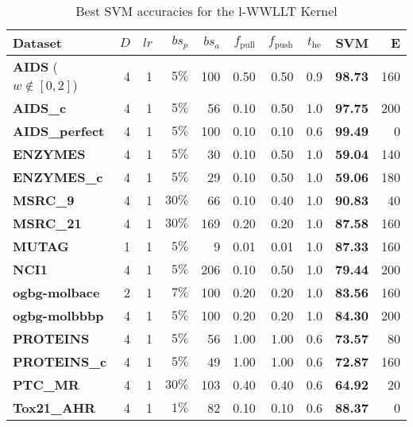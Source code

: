     	\begin{table}[h]
    		\centering
    		\begin{tabular}{|l||r|r|r|r|r|r|c||rr|}
    			\hline
    			\textbf{Dataset} & $D$ & $lr$ & $bs_p$ & $bs_a$ & $f_{\text{pull}}$ & $f_{\text{push}}$ & $t_{\text{he}}$ & \textbf{SVM} & E \\ \hline\hline
    			\textbf{AIDS} ($w\notin [0,2]$) & 4 & 1 & $5\%$ & 100 & 0.50 & 0.50 & 0.9 & \textbf{98.73} & 160 \\ \hline %
    			\textbf{AIDS\_c} 				& 4 & 1 & $5\%$ &  56 & 0.10 & 0.50 & 1.0 & \textbf{97.75} & 200 \\ \hline %
    			\textbf{AIDS\_perfect} 			& 4 & 1 & $5\%$ & 100 & 0.10 & 0.10 & 0.6 & \textbf{99.49} & 0	\\ \hline %
    			\textbf{ENZYMES} 				& 4 & 1 & $5\%$ &  30 & 0.10 & 0.50 & 1.0 & \textbf{59.04} & 140 \\ \hline %
    			\textbf{ENZYMES\_c} 			& 4 & 1 & $5\%$ &  29 & 0.10 & 0.50 & 1.0 & \textbf{59.06} & 180 \\ \hline %
    			\textbf{MSRC\_9} 				& 4 & 1 & $30\%$ &  66 & 0.10 & 0.40 & 1.0 & \textbf{90.83} & 40 	\\ \hline %
    			\textbf{MSRC\_21} 				& 4 & 1 & $30\%$ & 169 & 0.20 & 0.20 & 1.0 & \textbf{87.58} & 160 \\ \hline %
    			\textbf{MUTAG} 					& 1 & 1 & $5\%$ &   9 & 0.01 & 0.01 & 1.0 & \textbf{87.33} & 160 \\ \hline %
    			\textbf{NCI1} 					& 4 & 1 & $5\%$ & 206 & 0.10 & 0.50 & 1.0 & \textbf{79.44} & 200 \\ \hline %
    			\textbf{ogbg-molbace} 			& 2 & 1 & $7\%$ & 100 & 0.20 & 0.20 & 1.0 & \textbf{83.56} & 160	\\ \hline %
    			\textbf{ogbg-molbbbp} 			& 4 & 1 & $5\%$ & 100 & 0.20 & 0.20 & 1.0 & \textbf{84.30} & 200 \\ \hline %
    			\textbf{PROTEINS} 				& 4 & 1 & $5\%$ &  56 & 1.00 & 1.00 & 0.6 & \textbf{73.57} & 80 	\\ \hline %
    			\textbf{PROTEINS\_c} 			& 4 & 1 & $5\%$ &  49 & 1.00 & 1.00 & 0.6 & \textbf{72.87} & 160 \\ \hline %
    			\textbf{PTC\_MR} 				& 4 & 1 & $30\%$ & 103 & 0.40 & 0.40 & 0.6 & \textbf{64.92} & 20	\\ \hline %
    			\textbf{Tox21\_AHR} 			& 4 & 1 & $1\%$ &  82 & 0.10 & 0.10 & 0.6 & \textbf{88.37} & 0	\\ \hline %
    		\end{tabular}
    		\caption{Best SVM accuracies for the l-WWLLT Kernel}\label{tab:BestSVM_results}
    	\end{table}
    

